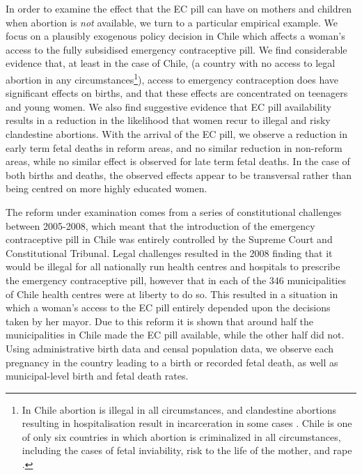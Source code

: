 In order to examine the effect that the EC pill can have on mothers and children 
when abortion is \emph{not} available, we turn to a particular empirical example.  
We focus on a plausibly exogenous policy decision in Chile which affects a 
woman's access to the fully subsidised emergency contraceptive pill.  We find 
considerable evidence that, at least in the case of Chile, (a country with no 
access to legal abortion in any circumstances\footnote{In Chile abortion is 
illegal in all circumstances, and clandestine abortions resulting in 
hospitalisation result in incarceration in some cases \citep{ShepardCasas2007}.  
Chile is one of only six countries in which abortion is criminalized in all 
circumstances, including the cases of fetal inviability, risk to the life of the 
mother, and rape \citep{UN2014}.}), access to emergency contraception does have 
significant effects on births, and that these effects are concentrated on 
teenagers and young women.  We also find suggestive evidence that EC pill
availability results in a reduction in the likelihood that women recur to
illegal and risky clandestine abortions.  With the arrival of the EC pill, we 
observe a reduction in early term fetal deaths in reform areas, and no similar 
reduction in non-reform areas, while no similar effect is observed for late term 
fetal deaths.  In the case of both births and deaths, the observed effects appear 
to be transversal rather than being centred on more highly educated women.

The reform under examination comes from a series of constitutional challenges 
between 2005-2008, which meant that the introduction of the emergency contraceptive 
pill in Chile was entirely controlled by the Supreme Court and Constitutional 
Tribunal.  Legal challenges resulted in the 2008 finding that it would be illegal 
for all nationally run health centres and hospitals to prescribe the emergency 
contraceptive pill, however that in each of the 346 municipalities of Chile health 
centres were at liberty to do so.  This resulted  in a situation in which a woman's 
access to the EC pill entirely depended upon the decisions taken by her mayor.  Due 
to this reform it is shown that around half the municipalities in Chile made the EC
pill available, while the other half did not.  Using administrative birth data and 
censal population data, we observe each pregnancy in the country leading to a birth
or recorded fetal death, as well as municipal-level birth and fetal death rates.

